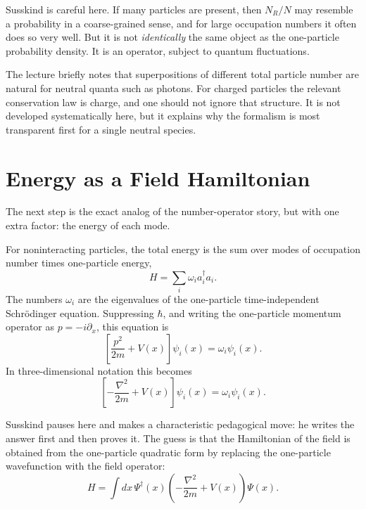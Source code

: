 Susskind is careful here. If many particles are present, then $N_R/N$ may resemble a probability in a coarse-grained sense, and for large occupation numbers it often does so very well. But it is not \emph{identically} the same object as the one-particle probability density. It is an operator, subject to quantum fluctuations.

\begin{remark}
The lecture briefly notes that superpositions of different total particle number are natural for neutral quanta such as photons. For charged particles the relevant conservation law is charge, and one should not ignore that structure. It is not developed systematically here, but it explains why the formalism is most transparent first for a single neutral species.
\end{remark}

\section{Energy as a Field Hamiltonian}

The next step is the exact analog of the number-operator story, but with one extra factor: the energy of each mode.

For noninteracting particles, the total energy is the sum over modes of occupation number times one-particle energy,
\begin{equation}
H=\sum_i \omega_i a_i^\dagger a_i.
\end{equation}
The numbers $\omega_i$ are the eigenvalues of the one-particle time-independent Schrödinger equation. Suppressing $\hbar$, and writing the one-particle momentum operator as $p=-i\partial_x$, this equation is
\begin{equation}
\left[\frac{p^2}{2m}+V(x)\right]\psi_i(x)=\omega_i\psi_i(x).
\end{equation}
In three-dimensional notation this becomes
\begin{equation}
\left[-\frac{\nabla^2}{2m}+V(x)\right]\psi_i(x)=\omega_i\psi_i(x).
\end{equation}

Susskind pauses here and makes a characteristic pedagogical move: he writes the answer first and then proves it. The guess is that the Hamiltonian of the field is obtained from the one-particle quadratic form by replacing the one-particle wavefunction with the field operator:
\begin{equation}
H=\int dx\,\Psi^\dagger(x)\left(-\frac{\nabla^2}{2m}+V(x)\right)\Psi(x).
\end{equation}

